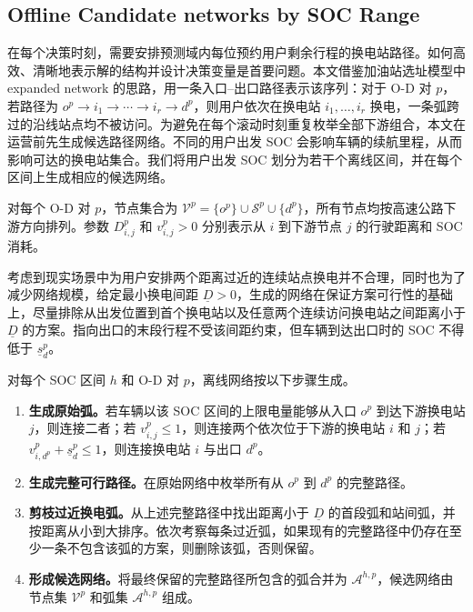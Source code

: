 \documentclass[12pt,a4paper,UTF8]{ctexart}
\begin{document}
\subsection{Offline Candidate networks by SOC Range}

在每个决策时刻，需要安排预测域内每位预约用户剩余行程的换电站路径。如何高效、清晰地表示解的结构并设计决策变量是首要问题。本文借鉴加油站选址模型中 expanded network 的思路，用一条入口--出口路径表示该序列：对于 O-D 对 $p$，若路径为
$o^p\rightarrow i_1\rightarrow\cdots\rightarrow i_r\rightarrow d^p$，则用户依次在换电站 $i_1,\ldots,i_r$ 换电，一条弧跨过的沿线站点均不被访问。为避免在每个滚动时刻重复枚举全部下游组合，本文在运营前先生成候选路径网络。不同的用户出发 SOC 会影响车辆的续航里程，从而影响可达的换电站集合。我们将用户出发 SOC 划分为若干个离线区间，并在每个区间上生成相应的候选网络。

对每个 O-D 对 $p$，节点集合为
$\mathcal V^p=\{o^p\}\cup\mathcal S^p\cup\{d^p\}$，所有节点均按高速公路下游方向排列。参数 $D_{i,j}^p$ 和 $v_{i,j}^p>0$ 分别表示从 $i$ 到下游节点 $j$ 的行驶距离和 SOC 消耗。

考虑到现实场景中为用户安排两个距离过近的连续站点换电并不合理，同时也为了减少网络规模，给定最小换电间距 $\underline D>0$，生成的网络在保证方案可行性的基础上，尽量排除从出发位置到首个换电站以及任意两个连续访问换电站之间距离小于 $\underline D$ 的方案。指向出口的末段行程不受该间距约束，但车辆到达出口时的 SOC 不得低于 $\underline s_d^p$。

对每个 SOC 区间 $h$ 和 O-D 对 $p$，离线网络按以下步骤生成。

\begin{enumerate}
  \item[\textbf{Step 1.}] \textbf{生成原始弧。}若车辆以该 SOC 区间的上限电量能够从入口 $o^p$ 到达下游换电站 $j$，则连接二者；若 $v_{i,j}^p\le1$，则连接两个依次位于下游的换电站 $i$ 和 $j$；若 $v_{i,d^p}^p+\underline s_d^p\le1$，则连接换电站 $i$ 与出口 $d^p$。

  \item[\textbf{Step 2.}] \textbf{生成完整可行路径。}在原始网络中枚举所有从 $o^p$ 到 $d^p$ 的完整路径。

  \item[\textbf{Step 3.}] \textbf{剪枝过近换电弧。}从上述完整路径中找出距离小于 $\underline D$ 的首段弧和站间弧，并按距离从小到大排序。依次考察每条过近弧，如果现有的完整路径中仍存在至少一条不包含该弧的方案，则删除该弧，否则保留。

  \item[\textbf{Step 4.}] \textbf{形成候选网络。}将最终保留的完整路径所包含的弧合并为 $\mathcal A^{h,p}$，候选网络由节点集 $\mathcal V^p$ 和弧集 $\mathcal A^{h,p}$ 组成。
\end{enumerate}
\end{document}
